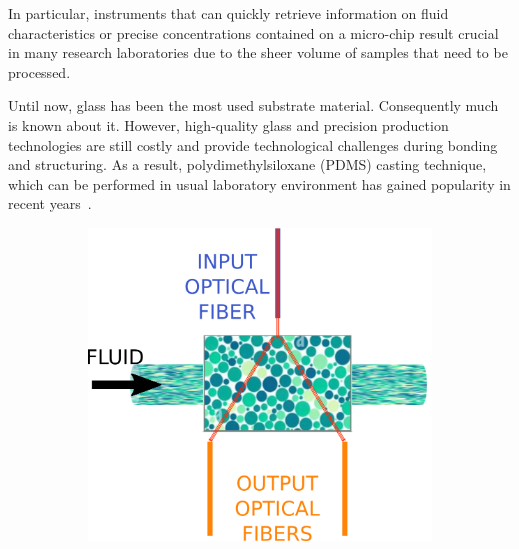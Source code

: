 \documentclass[sn-mathphys]{sn-jnl}
\theoremstyle{thmstyleone}%
\theoremstyle{thmstyletwo}%
\theoremstyle{thmstylethree}%
\begin{document}
In particular, instruments that can quickly retrieve information on fluid characteristics or precise concentrations contained on a micro-chip result crucial in many research laboratories due to the sheer volume of samples that need to be processed.

Until now, glass has been the most used substrate material. Consequently much is known about it. However, high-quality glass and precision production technologies are still costly and provide technological challenges during bonding and structuring. As a result, polydimethylsiloxane (PDMS) casting technique, which can be performed in usual laboratory environment has gained popularity in recent years~\cite{2020-RajCha}.

\begin{figure}[t]
	\centering
	\begin{subfigure}[b]{0.32\columnwidth}
		\includegraphics[width=\textwidth]{wp-chamber.png}
		\caption{}
		\label{fig:wp-chamber}
	\end{subfigure}
	\centering
	\begin{subfigure}[b]{0.32\columnwidth}

\end{subfigure}
\end{figure}
\end{document}
